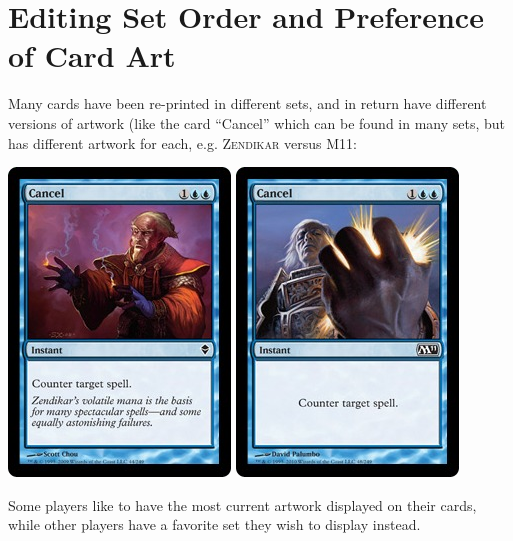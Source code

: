 \documentclass[a4paper]{scrbook}
\begin{document}
\section{Editing Set Order and Preference of Card Art}
Many cards have been re-printed in different sets, and in return have different versions of artwork (like the card “Cancel” which can be found in many sets, but has different artwork for each, e.g. \textsc{Zendikar} versus \textsc{M11}:
\begin{center}
\includegraphics{pics/fetchc18b}
\includegraphics{pics/fetche1f4}
\end{center}

Some players like to have the most current artwork displayed on their cards, while other players have a favorite set they wish to display instead.
\end{document}
